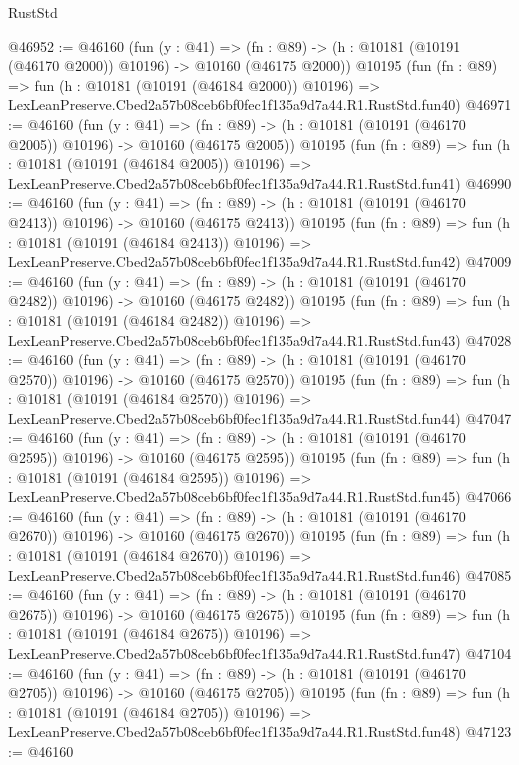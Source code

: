 \begin{lexlean}{RustStd}
\begin{coremodule}
@46952 := @46160
    (fun (y : @41) =>
    (fn : @89) -> (h : @10181 (@10191 (@46170 @2000)) @10196) -> @10160 (@46175 @2000))
    @10195
    (fun (fn : @89) =>
    fun (h : @10181 (@10191 (@46184 @2000)) @10196) =>
    LexLeanPreserve.Cbed2a57b08ceb6bf0fec1f135a9d7a44.R1.RustStd.fun40)
@46971 := @46160
    (fun (y : @41) =>
    (fn : @89) -> (h : @10181 (@10191 (@46170 @2005)) @10196) -> @10160 (@46175 @2005))
    @10195
    (fun (fn : @89) =>
    fun (h : @10181 (@10191 (@46184 @2005)) @10196) =>
    LexLeanPreserve.Cbed2a57b08ceb6bf0fec1f135a9d7a44.R1.RustStd.fun41)
@46990 := @46160
    (fun (y : @41) =>
    (fn : @89) -> (h : @10181 (@10191 (@46170 @2413)) @10196) -> @10160 (@46175 @2413))
    @10195
    (fun (fn : @89) =>
    fun (h : @10181 (@10191 (@46184 @2413)) @10196) =>
    LexLeanPreserve.Cbed2a57b08ceb6bf0fec1f135a9d7a44.R1.RustStd.fun42)
@47009 := @46160
    (fun (y : @41) =>
    (fn : @89) -> (h : @10181 (@10191 (@46170 @2482)) @10196) -> @10160 (@46175 @2482))
    @10195
    (fun (fn : @89) =>
    fun (h : @10181 (@10191 (@46184 @2482)) @10196) =>
    LexLeanPreserve.Cbed2a57b08ceb6bf0fec1f135a9d7a44.R1.RustStd.fun43)
@47028 := @46160
    (fun (y : @41) =>
    (fn : @89) -> (h : @10181 (@10191 (@46170 @2570)) @10196) -> @10160 (@46175 @2570))
    @10195
    (fun (fn : @89) =>
    fun (h : @10181 (@10191 (@46184 @2570)) @10196) =>
    LexLeanPreserve.Cbed2a57b08ceb6bf0fec1f135a9d7a44.R1.RustStd.fun44)
@47047 := @46160
    (fun (y : @41) =>
    (fn : @89) -> (h : @10181 (@10191 (@46170 @2595)) @10196) -> @10160 (@46175 @2595))
    @10195
    (fun (fn : @89) =>
    fun (h : @10181 (@10191 (@46184 @2595)) @10196) =>
    LexLeanPreserve.Cbed2a57b08ceb6bf0fec1f135a9d7a44.R1.RustStd.fun45)
@47066 := @46160
    (fun (y : @41) =>
    (fn : @89) -> (h : @10181 (@10191 (@46170 @2670)) @10196) -> @10160 (@46175 @2670))
    @10195
    (fun (fn : @89) =>
    fun (h : @10181 (@10191 (@46184 @2670)) @10196) =>
    LexLeanPreserve.Cbed2a57b08ceb6bf0fec1f135a9d7a44.R1.RustStd.fun46)
@47085 := @46160
    (fun (y : @41) =>
    (fn : @89) -> (h : @10181 (@10191 (@46170 @2675)) @10196) -> @10160 (@46175 @2675))
    @10195
    (fun (fn : @89) =>
    fun (h : @10181 (@10191 (@46184 @2675)) @10196) =>
    LexLeanPreserve.Cbed2a57b08ceb6bf0fec1f135a9d7a44.R1.RustStd.fun47)
@47104 := @46160
    (fun (y : @41) =>
    (fn : @89) -> (h : @10181 (@10191 (@46170 @2705)) @10196) -> @10160 (@46175 @2705))
    @10195
    (fun (fn : @89) =>
    fun (h : @10181 (@10191 (@46184 @2705)) @10196) =>
    LexLeanPreserve.Cbed2a57b08ceb6bf0fec1f135a9d7a44.R1.RustStd.fun48)
@47123 := @46160

\end{coremodule}
\end{lexlean}
